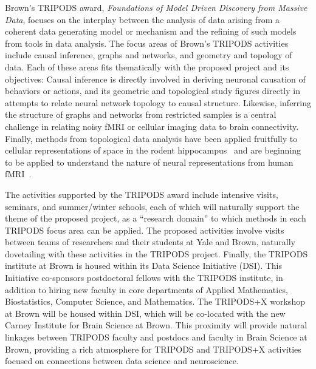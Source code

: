 
Brown's TRIPODS award, \emph{Foundations of Model Driven Discovery from Massive Data}, focuses on the interplay between the analysis of data arising from a coherent data generating model or mechanism and the refining of such models from tools in data analysis. The focus areas of Brown's TRIPODS activities include causal inference, graphs and networks, and geometry and topology of data. Each of these areas fits thematically with the proposed project and its objectives: Causal inference is directly involved in deriving neuronal causation of behaviors or actions, and its geometric and topological study figures directly in attempts to relate neural network topology to causal structure. Likewise, inferring the structure of graphs and networks from restricted samples is a central challenge in relating noisy fMRI or cellular imaging data to brain connectivity. Finally, methods from topological data analysis have been applied fruitfully to cellular representations of space in the rodent hippocampus~\citep{Dabaghian:2012} and are beginning to be applied to understand the nature of neural representations from human fMRI~\citep{Saggar:2018}.

The activities supported by the TRIPODS award include intensive visits, seminars, and summer/winter schools, each of which will naturally support the theme of the proposed project, as a ``research domain'' to which methods in each TRIPODS focus area can be applied. The proposed activities involve visits between teams of researchers and their students at Yale and Brown, naturally dovetailing with these activities in the TRIPODS project. Finally, the TRIPODS institute at Brown is housed within its Data Science Initiative (DSI). This Initiative co-sponsors postdoctoral fellows with the TRIPODS institute, in addition to hiring new faculty in core departments of Applied Mathematics, Biostatistics, Computer Science, and Mathematics. The TRIPODS+X workshop at Brown will be housed within DSI, which will be co-located with the new Carney Institute for Brain Science at Brown. This proximity will provide natural linkages between TRIPODS faculty and postdocs and faculty in Brain Science at Brown, providing a rich atmosphere for TRIPODS and TRIPODS+X activities focused on connections between data science and neuroscience.
